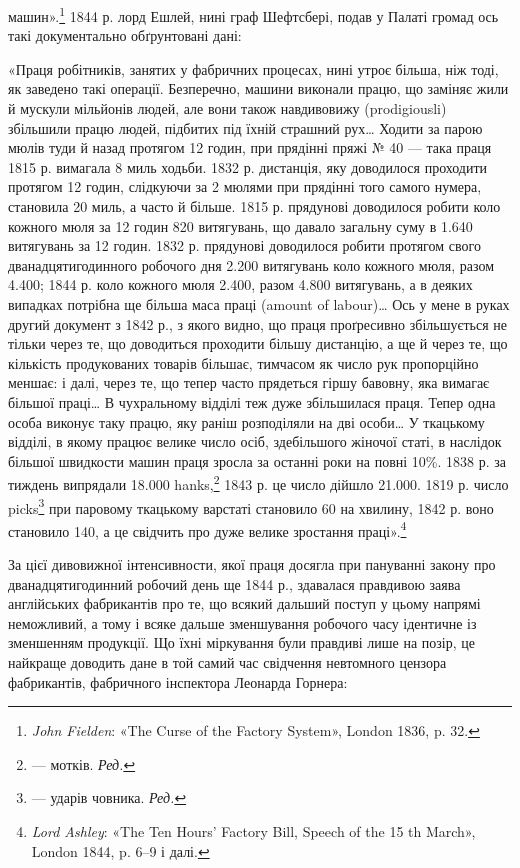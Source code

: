 \parcont{}  %
машин».\footnote{
\emph{John Fielden}: «The Curse of the Factory System», London
1836, p. 32.
} 1844 р. лорд Ешлей, нині граф Шефтсбері, подав
у Палаті громад ось такі документально обґрунтовані дані:

«Праця робітників, занятих у фабричних процесах, нині утроє
більша, ніж тоді, як заведено такі операції. Безперечно, машини
виконали працю, що заміняє жили й мускули мільйонів людей,
але вони також навдивовижу (prodigiousli) збільшили працю
людей, підбитих під їхній страшний рух\dots{} Ходити за парою
мюлів туди й назад протягом 12 годин, при прядінні пряжі
№ 40 — така праця 1815 р. вимагала 8 миль ходьби. 1832 р.
дистанція, яку доводилося проходити протягом 12 годин, слідкуючи
за 2 мюлями при прядінні того самого нумера, становила
20 миль, а часто й більше. 1815 р. прядунові доводилося робити
коло кожного мюля за 12 годин 820 витягувань, що давало загальну
суму в 1.640 витягувань за 12 годин. 1832 р. прядунові
доводилося робити протягом свого дванадцятигодинного робочого
дня 2.200 витягувань коло кожного мюля, разом 4.400; 1844 р.
коло кожного мюля 2.400, разом 4.800 витягувань, а в деяких
випадках потрібна ще більша маса праці (amount of labour)\dots{}
Ось у мене в руках другий документ з 1842 р., з якого видно,
що праця проґресивно збільшується не тільки через те, що доводиться
проходити більшу дистанцію, а ще й через те, що кількість
продукованих товарів більшає, тимчасом як число рук пропорційно
меншає: і далі, через те, що тепер часто прядеться гіршу
бавовну, яка вимагає більшої праці\dots{} В чухральному відділі
теж дуже збільшилася праця. Тепер одна особа виконує таку
працю, яку раніш розподіляли на дві особи\dots{} У ткацькому відділі,
в якому працює велике число осіб, здебільшого жіночої
статі, в наслідок більшої швидкости машин праця зросла за
останні роки на повні 10\%. 1838 р. за тиждень випрядали 18.000
hanks,\footnote*{
— мотків. \emph{Ред.}
} 1843 р. це число дійшло 21.000. 1819 р. число picks\footnote*{
— ударів човника. \emph{Ред.}
}
при паровому ткацькому варстаті становило 60 на хвилину, 1842 р.
воно становило 140, а це свідчить про дуже велике зростання
праці».\footnote{
\emph{Lord Ashley}: «The Ten Hours’ Factory Bill, Speech of the 15 th
March», London 1844, p. 6--9 і далі.
}

За цієї дивовижної інтенсивности, якої праця досягла при пануванні
закону про дванадцятигодинний робочий день ще 1844 р.,
здавалася правдивою заява англійських фабрикантів про те,
що всякий дальший поступ у цьому напрямі неможливий, а
тому і всяке дальше зменшування робочого часу ідентичне із
зменшенням продукції. Що їхні міркування були правдиві лише
на позір, це найкраще доводить дане в той самий час свідчення
невтомного цензора фабрикантів, фабричного інспектора Леонарда
Горнера:

